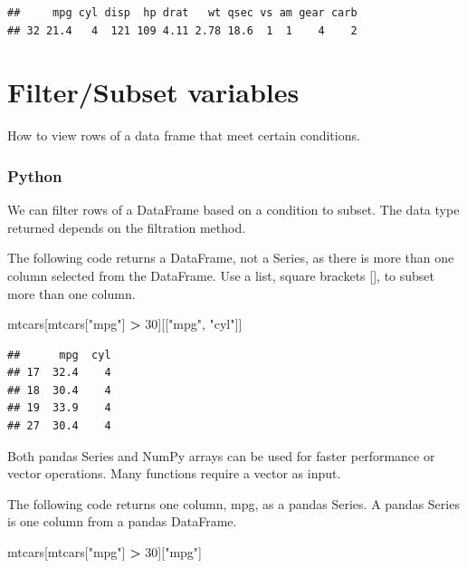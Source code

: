 \documentclass[
]{book}
\newenvironment{Shaded}{\begin{snugshade}}{\end{snugshade}}
\newcommand{\DecValTok}[1]{\textcolor[rgb]{0.00,0.00,0.81}{#1}}
\newcommand{\NormalTok}[1]{#1}
\newcommand{\OperatorTok}[1]{\textcolor[rgb]{0.81,0.36,0.00}{\textbf{#1}}}
\newcommand{\StringTok}[1]{\textcolor[rgb]{0.31,0.60,0.02}{#1}}
\begin{document}
\begin{verbatim}
##     mpg cyl disp  hp drat   wt qsec vs am gear carb
## 32 21.4   4  121 109 4.11 2.78 18.6  1  1    4    2
\end{verbatim}

\hypertarget{filtersubset-variables}{%
\section{Filter/Subset variables}\label{filtersubset-variables}}

How to view rows of a data frame that meet certain conditions.

\hypertarget{python-19}{%
\subsubsection*{Python}\label{python-19}}

We can filter rows of a DataFrame based on a condition to subset. The data type returned depends on the filtration method.

The following code returns a DataFrame, not a Series, as there is more than one column selected from the DataFrame. Use a list, square brackets {[}{]}, to subset more than one column.

\begin{Shaded}
\begin{Highlighting}[]
\NormalTok{mtcars[mtcars[}\StringTok{"mpg"}\NormalTok{] }\OperatorTok{\textgreater{}} \DecValTok{30}\NormalTok{][[}\StringTok{"mpg"}\NormalTok{, }\StringTok{"cyl"}\NormalTok{]]}
\end{Highlighting}
\end{Shaded}

\begin{verbatim}
##      mpg  cyl
## 17  32.4    4
## 18  30.4    4
## 19  33.9    4
## 27  30.4    4
\end{verbatim}

Both pandas Series and NumPy arrays can be used for faster performance or vector operations. Many functions require a vector as input.

The following code returns one column, mpg, as a pandas Series. A pandas Series is one column from a pandas DataFrame.

\begin{Shaded}
\begin{Highlighting}[]
\NormalTok{mtcars[mtcars[}\StringTok{"mpg"}\NormalTok{] }\OperatorTok{\textgreater{}} \DecValTok{30}\NormalTok{][}\StringTok{"mpg"}\NormalTok{]}
\end{Highlighting}
\end{Shaded}
\end{document}
